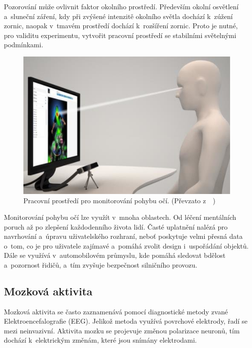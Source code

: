         Pozorování může ovlivnit faktor okolního prostředí. Především okolní osvětlení a~sluneční záření, kdy při zvýšené intenzitě okolního světla dochází k~zúžení zornic, naopak v~tmavém prostředí dochází k~rozšíření zornic. Proto je nutné, pro validitu experimentu, vytvořit pracovní prostředí se stabilními světelnými podmínkami.
        
        \begin{figure}[H]
            \centering
            \includegraphics[width=\textwidth]{obrazky-figures/Eye-tracking-setup.png}
            \caption{Pracovní prostředí pro monitorování pohybu očí. (Převzato z~~\cite{eye_tracking_setup})}
            \label{fig:eye_tracking_setup}
        \end{figure}
        
        Monitorování pohybu očí lze využít v~mnoha oblastech. Od léčení mentálních poruch až po zlepšení každodenního života lidí. Časté uplatnění nalézá pro navrhování a~úpravu uživatelského rozhraní, neboť poskytuje velmi přesná data o~tom, co je pro uživatele zajímavé a~pomáhá zvolit design i~uspořádání objektů. Dále se využívá v~automobilovém průmyslu, kde pomáhá sledovat bdělost a~pozornost řidičů, a~tím zvyšuje bezpečnost silničního provozu.
        
        \subsection{Mozková aktivita}
        Mozková aktivita se často zaznamenává pomocí diagnostické metody zvané Elektroencefalografie (EEG). Jelikož metoda využívá povrchové elektrody, řadí se mezi neinvazivní. Aktivita mozku se projevuje změnou polarizace neuronů, tím dochází k~elektrickým změnám, které jsou snímány elektrodami.
            

